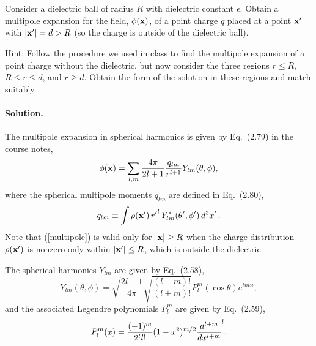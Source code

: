 \documentclass[11pt]{article}
\newcommand{\refeq}[1]{(\ref{#1})}
\newcommand{\beq}{\begin{equation*}}
\newcommand{\eeq}{\end{equation*}}
\newcommand{\beqn}{\begin{equation}}
\newcommand{\eeqn}{\end{equation}}
\newenvironment{statement}[1]
{
	\section{#1}
	\color{darkgray}
	\ignorespaces
}
{
}
\newenvironment{solution}
{
    \paragraph{Solution.}
    \ignorespaces
}
{
    \bigskip
}
\begin{document}
\newcommand{\eps}{\epsilon}
\newcommand{\vx}{\vb{x}}
\newcommand{\phix}{\phi(\vx)}
\newcommand{\tht}{\theta}
\newcommand{\cost}{\cos\tht}
\newcommand{\vph}{\varphi}
\newcommand{\absx}{\abs{\vx}}

\newcommand{\qlm}{q_{l m}}
\newcommand{\Ylm}{Y_{l m}}
\newcommand{\tv}{(\tht, \phi)}
\newcommand{\tvp}{(\tht', \phi')}
\newcommand{\Ylmtv}{\Ylm\tv}
\newcommand{\Plm}{P_l^m}
\newcommand{\rhoxp}{\rho(\vx')}

\newcommand{\sintp}{\sin\tht'}
\newcommand{\costp}{\cos\tht'}
\newcommand{\dcxp}{\dd[3]{x'}}
\newcommand{\intoR}{\int_0^R}
\newcommand{\intono}{\int_{-1}^1}
\newcommand{\intotp}{\int_0^{2\pi}}
\newcommand{\intopi}{\int_0^\pi}
\newcommand{\drp}{\dd{r'}}
\newcommand{\dtp}{\dd{\tht'}}
\newcommand{\dctp}{\dd{(\costp)}}
\newcommand{\dvp}{\dd{\vph'}}

\begin{statement}{}
	Consider a dielectric ball of radius $R$ with dielectric constant $\eps$.  Obtain a multipole expansion for the field, $\phix$, of a point charge $q$ placed at a point $\vx'$ with $\abs{\vx'} = d > R$ (so the charge is outside of the dielectric ball).
	
	Hint: Follow the procedure we used in class to find the multipole expansion of a point charge without the dielectric, but now consider the three regions $r \leq R$, $R \leq r \leq d$, and $r \geq d$.  Obtain the form of the solution in these regions and match suitably.
\end{statement}

\begin{solution}
	The multipole expansion in spherical harmonics is given by Eq.~(2.79) in the course notes,
	\beqn \label{multipole}
		\phix = \sum_{l, m} \frac{4\pi}{2l + 1} \frac{\qlm}{r^{l + 1}} \Ylmtv,
	\eeqn
	where the spherical multipole moments $\qlm$ are defined in Eq.~(2.80),
	\beq
		\qlm \equiv \int \rhoxp \, {r'}^l \, \Ylm^*\tvp \dcxp.
	\eeq
	Note that \refeq{multipole} is valid only for $\absx \geq R$ when the charge distribution $\rhoxp$ is nonzero only within $\abs{\vx'} \leq R$, which is outside the dielectric.
	
	The spherical harmonics $\Ylm$ are given by Eq.~(2.58),
	\beq
		\Ylmtv = \sqrt{\frac{2l + 1}{4\pi}} \sqrt{\frac{(l - m)!}{(l + m)!}} \Plm(\cost) e^{i m \vph},
	\eeq
	and the associated Legendre polynomials $\Plm$ are given by Eq.~(2.59),
	\beq
		\Plm(x) = \frac{(-1)^m}{2^l l!} (1 - x^2)^{m/2} \dv[l + m]{}{x} (x^2 - 1)^l.
	\eeq
\end{solution}
\end{document}
